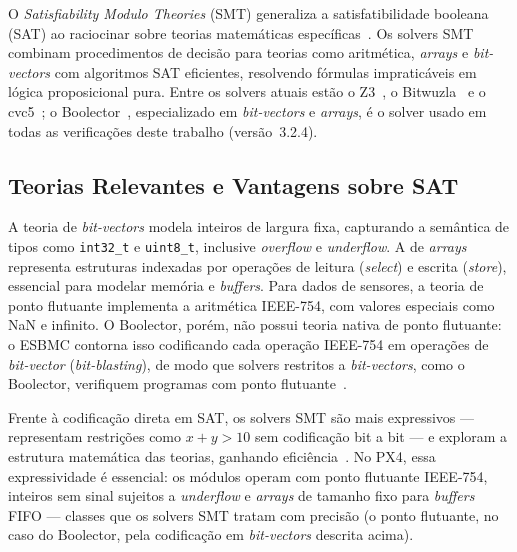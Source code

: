 O \textit{Satisfiability Modulo Theories} (SMT) generaliza a satisfatibilidade
booleana (SAT) ao raciocinar sobre teorias matemáticas
específicas~\cite{Barrett2018}. Os solvers SMT combinam procedimentos de decisão
para teorias como aritmética, \textit{arrays} e \textit{bit-vectors} com
algoritmos SAT eficientes, resolvendo fórmulas impraticáveis em lógica
proposicional pura. Entre os solvers atuais estão o Z3~\cite{deMoura2008}, o
Bitwuzla~\cite{Niemetz2023} e o cvc5~\cite{Barbosa2022}; o
Boolector~\cite{Brummayer2009}, especializado em \textit{bit-vectors} e
\textit{arrays}, é o solver usado em todas as verificações deste trabalho
(versão~3.2.4).

\subsection{Teorias Relevantes e Vantagens sobre SAT}

A teoria de \textit{bit-vectors} modela inteiros de largura fixa, capturando a
semântica de tipos como \texttt{int32\_t} e \texttt{uint8\_t}, inclusive
\textit{overflow} e \textit{underflow}. A de \textit{arrays} representa estruturas
indexadas por operações de leitura (\textit{select}) e escrita (\textit{store}),
essencial para modelar memória e \textit{buffers}. Para dados de sensores, a
teoria de ponto flutuante implementa a aritmética IEEE-754, com valores especiais
como NaN e infinito. O Boolector, porém, não possui teoria nativa de ponto
flutuante: o ESBMC contorna isso codificando cada operação IEEE-754 em operações
de \textit{bit-vector} (\textit{bit-blasting}), de modo que solvers restritos a
\textit{bit-vectors}, como o Boolector, verifiquem programas com ponto
flutuante~\cite{Gadelha2020}.

Frente à codificação direta em SAT, os solvers SMT são mais expressivos ---
representam restrições como $x + y > 10$ sem codificação bit a bit --- e exploram
a estrutura matemática das teorias, ganhando eficiência~\cite{deMoura2008}. No
PX4, essa expressividade é essencial: os módulos operam com ponto flutuante
IEEE-754, inteiros sem sinal sujeitos a \textit{underflow} e \textit{arrays} de
tamanho fixo para \textit{buffers} FIFO --- classes que os solvers SMT tratam com
precisão (o ponto flutuante, no caso do Boolector, pela codificação em
\textit{bit-vectors} descrita acima).

